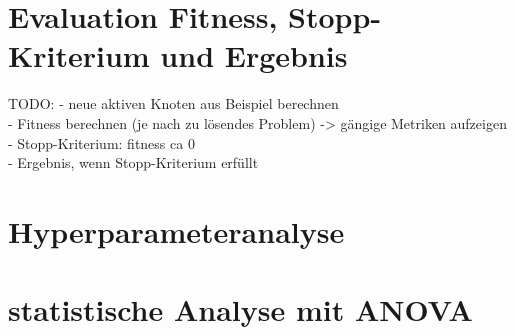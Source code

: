 \section{Evaluation Fitness, Stopp-Kriterium und Ergebnis}
\label{sec:fitness,StopKrit,Ergebnis}

TODO:
- neue aktiven Knoten aus Beispiel berechnen\\
- Fitness berechnen (je nach zu lösendes Problem) -> gängige Metriken aufzeigen\\
- Stopp-Kriterium: fitness ca 0\\
- Ergebnis, wenn Stopp-Kriterium erfüllt

\section{Hyperparameteranalyse}
\label{sec:Hyperparameteranalyse}

\section{statistische Analyse mit ANOVA}
\label{sec:anova}



